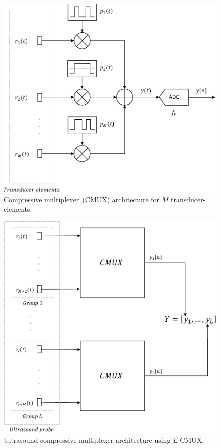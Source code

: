 \documentclass[9pt,conference]{IEEEtran}
\begin{document}
\begin{figure}[htb]
	\centering
	\includegraphics[scale = 0.4]{figures/CMUX.pdf}
	\caption{Compressive multiplexer~(CMUX) architecture for $M$ transducer-elements.}
	\label{fig:CMUX}
\end{figure}
\begin{figure}[htb]
	\centering
	\includegraphics[scale = 0.4]{figures/USCMUX.pdf}
	\caption{Ultrasound compressive multiplexer architecture using $L$ CMUX.}
	\label{fig:USCMUX}
\end{figure}
\end{document}
